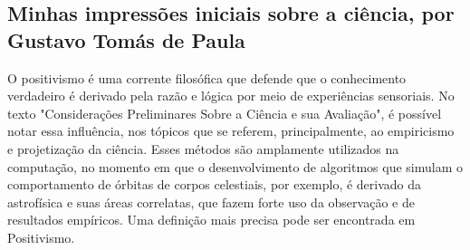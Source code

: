 \subsection{Minhas impressões iniciais sobre a ciência, por Gustavo Tomás de Paula}

O positivismo \citep{wikipedia_positivismo_2022} é uma corrente filosófica que defende que o conhecimento verdadeiro é derivado pela razão e lógica por meio de experiências sensoriais. No texto "Considerações Preliminares Sobre a Ciência e sua Avaliação", é possível notar essa influência, nos tópicos que se referem, principalmente, ao empiricismo e projetização da ciência. Esses métodos são amplamente utilizados na computação, no momento em que o desenvolvimento de algoritmos que simulam o comportamento de órbitas de corpos celestiais, por exemplo, é derivado da astrofísica e suas áreas correlatas, que fazem forte uso da observação e de resultados empíricos. Uma definição mais precisa pode ser encontrada em \gls{Positivismo}.
